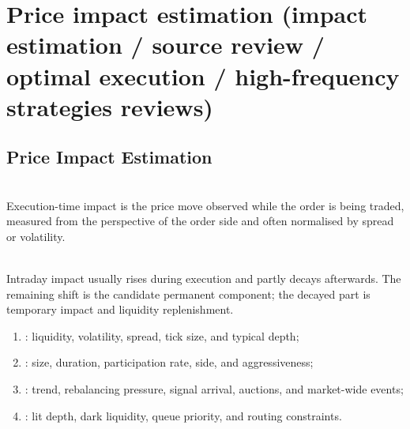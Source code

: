 \documentclass[a4paper,oneside,openany]{book}
\begin{document}
\section*{Price impact estimation (impact estimation / source review / optimal execution / high-frequency strategies reviews)}

\subsection*{Price Impact Estimation}

\begin{definition} \\
Execution-time impact is the price move observed while the order is being traded, measured from the perspective of the order side and often normalised by spread or volatility.
\end{definition}

\begin{empiricalfinding} \\
Intraday impact usually rises during execution and partly decays afterwards. The remaining shift is the candidate permanent component; the decayed part is temporary impact and liquidity replenishment.
\end{empiricalfinding}

\begin{taxonomy} 
\begin{enumerate}[label=\roman*.]
\setlength{\itemsep}{0pt}
\item {}: liquidity, volatility, spread, tick size, and typical depth;
\item {}: size, duration, participation rate, side, and aggressiveness;
\item {}: trend, rebalancing pressure, signal arrival, auctions, and market-wide events;
\item {}: lit depth, dark liquidity, queue priority, and routing constraints.
\end{enumerate}
\end{taxonomy}
\end{document}
